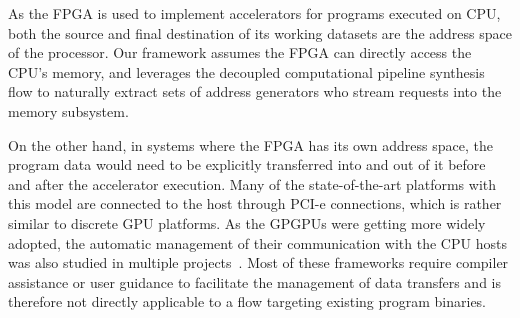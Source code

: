 As the FPGA is used to implement accelerators for %
programs executed on CPU, both the source
and final destination of its working datasets are the address space of
the processor. Our framework assumes the FPGA can directly access the CPU's memory, and leverages the decoupled computational pipeline synthesis flow to naturally extract sets of address generators who stream requests
into the memory subsystem. 
%
%
%

%
On the other hand, %
in systems where the FPGA has its own address space, 
the program data would need to be explicitly transferred into and out of it before and after the accelerator execution. %
Many of the state-of-the-art platforms with this model
are connected to the host through PCI-e connections, which is rather similar to discrete GPU platforms.
As the GPGPUs were getting more widely adopted, the automatic management of their communication with the CPU hosts was also studied in multiple projects~\cite{Pai:2012:FEA:2370816.2370824}\cite{Jablin:2011:ACC:1993316.1993516}\cite{Jablin:2012:DMD:2259016.2259038}. Most of these frameworks require compiler assistance or user guidance to facilitate the management of data transfers and is therefore not directly applicable to a flow targeting existing program binaries. 

